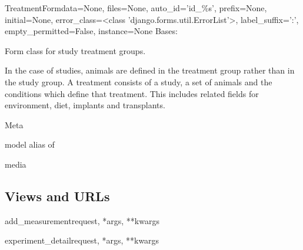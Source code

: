 \documentclass[letterpaper,10pt,english]{sphinxmanual}
\begin{document}
\hypertarget{data.forms.TreatmentForm}{}\begin{classdesc}{TreatmentForm}{data=None, files=None, auto\_id='id\_\%s', prefix=None, initial=None, error\_class=\textless{}class 'django.forms.util.ErrorList'\textgreater{}, label\_suffix=':', empty\_permitted=False, instance=None}
Bases: 

Form class for study treatment groups.

In the case of studies, animals are defined in the treatment group rather than in the study group.  A treatment consists of a study, a set of animals and the conditions which define that treatment.  This includes related fields for environment, diet, implants and transplants.

\hypertarget{data.forms.TreatmentForm.Meta}{}\begin{classdesc}{Meta}{}~

\hypertarget{data.forms.TreatmentForm.Meta.model}{}\begin{memberdesc}{model}
alias of 
\end{memberdesc}
\end{classdesc}

\hypertarget{data.forms.TreatmentForm.media}{}\begin{memberdesc}[TreatmentForm]{media}\end{memberdesc}
\end{classdesc}


\subsection{Views and URLs}
\hypertarget{module-data.views}{}
\modulesynopsis{}

\hypertarget{data.views.add\_measurement}{}\begin{funcdesc}{add\_measurement}{request, *args, **kwargs}\end{funcdesc}

\hypertarget{data.views.experiment\_detail}{}\begin{funcdesc}{experiment\_detail}{request, *args, **kwargs}\end{funcdesc}
\end{document}
